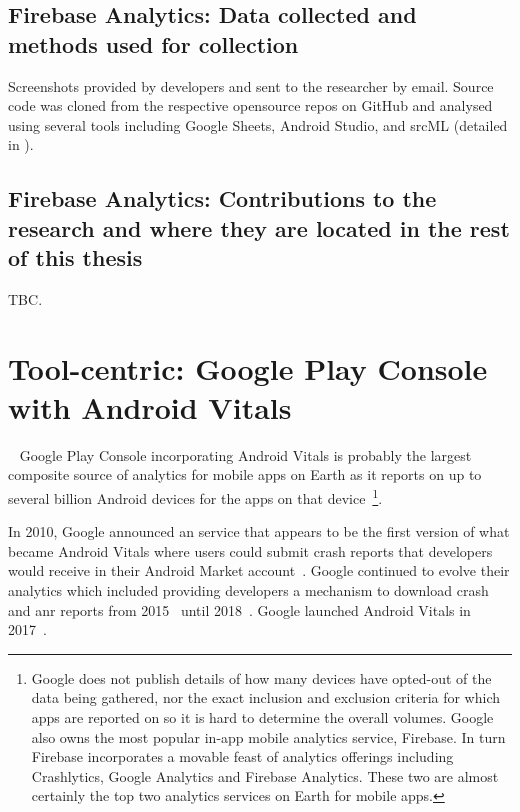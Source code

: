 \subsection{Firebase Analytics: Data collected and methods used for collection}
Screenshots provided by developers and sent to the researcher by email. Source code was cloned from the respective opensource repos on GitHub and analysed using several tools including Google Sheets, Android Studio, and srcML (detailed in ).

\subsection{Firebase Analytics: Contributions to the research and where they are located in the rest of this thesis}
TBC.




\section{Tool-centric: Google Play Console with Android Vitals}~\label{case-study-overview-google-play-console-with-android-vitals}
Google Play Console incorporating Android Vitals is probably the largest composite source of analytics for mobile apps on Earth as it reports on up to several billion Android devices for the apps on that device~\footnote{Google does not publish details of how many devices have opted-out of the data being gathered, nor the exact inclusion and exclusion criteria for which apps are reported on so it is hard to determine the overall volumes. Google also owns the most popular in-app mobile analytics service, Firebase. In turn Firebase incorporates a movable feast of analytics offerings including Crashlytics, Google Analytics and Firebase Analytics. These two are almost certainly the top two analytics services on Earth for mobile apps.}.

In 2010, Google announced an service that appears to be the first version of what became Android Vitals where users could submit crash reports that developers would receive in their Android Market account~. Google continued to evolve their analytics which included providing developers a mechanism to download crash and \acrshort{anr} reports from 2015~ until 2018~. Google launched Android Vitals in 2017~.

